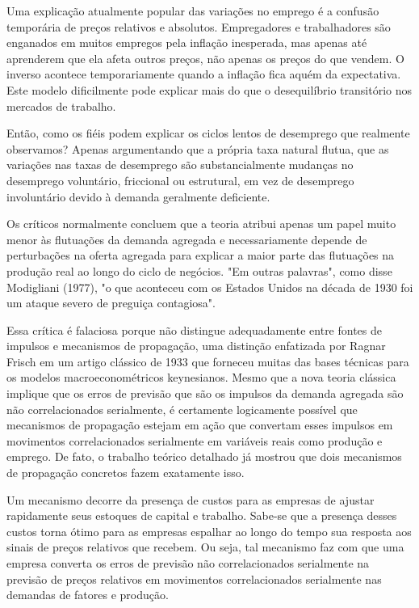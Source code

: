 \documentclass[a4paper,12pt]{article}[abntex2]
\begin{document}
Uma explicação atualmente popular das variações no emprego é a confusão temporária de preços relativos e absolutos. Empregadores e trabalhadores são enganados em muitos empregos pela inflação inesperada, mas apenas até aprenderem que ela afeta outros preços, não apenas os preços do que vendem. O inverso acontece temporariamente quando a inflação fica aquém da expectativa. Este modelo dificilmente pode explicar mais do que o desequilíbrio transitório nos mercados de trabalho.

Então, como os fiéis podem explicar os ciclos lentos de desemprego que realmente observamos? Apenas argumentando que a própria taxa natural flutua, que as variações nas taxas de desemprego são substancialmente mudanças no desemprego voluntário, friccional ou estrutural, em vez de desemprego involuntário devido à demanda geralmente deficiente.

Os críticos normalmente concluem que a teoria atribui apenas um papel muito menor às flutuações da demanda agregada e necessariamente depende de perturbações na oferta agregada para explicar a maior parte das flutuações na produção real ao longo do ciclo de negócios. "Em outras palavras", como disse Modigliani (1977), "o que aconteceu com os Estados Unidos na década de 1930 foi um ataque severo de preguiça contagiosa".

Essa crítica é falaciosa porque não distingue adequadamente entre fontes de impulsos e mecanismos de propagação, uma distinção enfatizada por Ragnar Frisch em um artigo clássico de 1933 que forneceu muitas das bases técnicas para os modelos macroeconométricos keynesianos. Mesmo que a nova teoria clássica implique que os erros de previsão que são os impulsos da demanda agregada são não correlacionados serialmente, é certamente logicamente possível que mecanismos de propagação estejam em ação que convertam esses impulsos em movimentos correlacionados serialmente em variáveis reais como produção e emprego. De fato, o trabalho teórico detalhado já mostrou que dois mecanismos de propagação concretos fazem exatamente isso.

Um mecanismo decorre da presença de custos para as empresas de ajustar rapidamente seus estoques de capital e trabalho. Sabe-se que a presença desses custos torna ótimo para as empresas espalhar ao longo do tempo sua resposta aos sinais de preços relativos que recebem. Ou seja, tal mecanismo faz com que uma empresa converta os erros de previsão não correlacionados serialmente na previsão de preços relativos em movimentos correlacionados serialmente nas demandas de fatores e produção.
\end{document}

